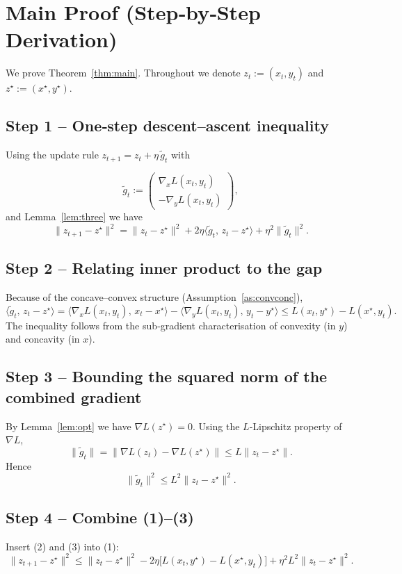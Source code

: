 \documentclass{article}
\begin{document}
\section*{Main Proof (Step‑by‑Step Derivation)}
We prove Theorem~\ref{thm:main}. Throughout we denote $z_{t}:=(x_{t},y_{t})$ and $z^{\star}:=(x^{\star},y^{\star})$.

\subsection*{Step 1 – One‑step descent–ascent inequality}
Using the update rule $z_{t+1}=z_{t}+ \eta\,\tilde g_{t}$ with  

\[
\tilde g_{t}:=
\begin{pmatrix}
\nabla_{x}L(x_{t},y_{t})\\[2pt]
-\nabla_{y}L(x_{t},y_{t})
\end{pmatrix},
\]
and Lemma~\ref{lem:three} we have
\[
\|z_{t+1}-z^{\star}\|^{2}
= \|z_{t}-z^{\star}\|^{2}
+2\eta\langle \tilde g_{t},\,z_{t}-z^{\star}\rangle
+\eta^{2}\|\tilde g_{t}\|^{2}. \tag{1}
\]

\subsection*{Step 2 – Relating inner product to the gap}
Because of the concave–convex structure (Assumption~\ref{as:convconc}),
\[
\langle \tilde g_{t},\,z_{t}-z^{\star}\rangle
= \langle \nabla_{x}L(x_{t},y_{t}),\,x_{t}-x^{\star}\rangle
-\langle \nabla_{y}L(x_{t},y_{t}),\,y_{t}-y^{\star}\rangle
\le L(x_{t},y^{\star})-L(x^{\star},y_{t}). \tag{2}
\]
The inequality follows from the sub‑gradient characterisation of convexity (in $y$) and concavity (in $x$).

\subsection*{Step 3 – Bounding the squared norm of the combined gradient}
By Lemma~\ref{lem:opt} we have $\nabla L(z^{\star})=0$.  
Using the $L$‑Lipschitz property of $\nabla L$,
\[
\|\tilde g_{t}\|
= \|\nabla L(z_{t})-\nabla L(z^{\star})\|
\le L\|z_{t}-z^{\star}\|.
\]
Hence
\[
\|\tilde g_{t}\|^{2}\le L^{2}\|z_{t}-z^{\star}\|^{2}. \tag{3}
\]

\subsection*{Step 4 – Combine (1)–(3)}
Insert (2) and (3) into (1):
\[
\|z_{t+1}-z^{\star}\|^{2}
\le \|z_{t}-z^{\star}\|^{2}
-2\eta\bigl[L(x_{t},y^{\star})-L(x^{\star},y_{t})\bigr]
+\eta^{2}L^{2}\|z_{t}-z^{\star}\|^{2}. \tag{4}
\]
\end{document}
